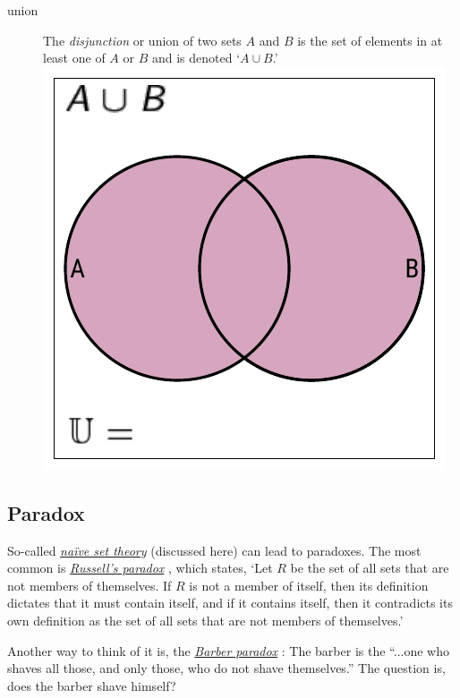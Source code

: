 \documentclass[11pt]{article}%
\begin{document}
\begin{multicols}{2}
\begin{description}
\item[union] The \textit{disjunction} or union of two sets $A$ and $B$ is the set of elements in at least one of $A$ or $B$ and is denoted `$A \cup B$.' \includegraphics*[scale = 0.75]{../../images/venn-2-or.pdf}

\end{description}

\subsection{Paradox}
\label{Paradox}

So-called \textit{\href{https://en.wikipedia.org/wiki/Naive_set_theory}{na\"ive set theory}} \citep{wiki:naive-set-theory} (discussed here) can lead to paradoxes. The most common is \textit{\href{https://en.wikipedia.org/wiki/Russell's_paradox}{Russell's paradox}} \citep{wiki:russells-paradox}, which states, `Let $R$ be the set of all sets that are not members of themselves. If $R$ is not a member of itself, then its definition dictates that it must contain itself, and if it contains itself, then it contradicts its own definition as the set of all sets that are not members of themselves.'

Another way to think of it is, the \textit{\href{https://en.wikipedia.org/wiki/Barber_paradox}{Barber paradox}} \citep{wiki:barber-paradox}: The barber is the ``...one who shaves all those, and only those, who do not shave themselves.'' The question is, does the barber shave himself?


\end{multicols}
\end{document}

